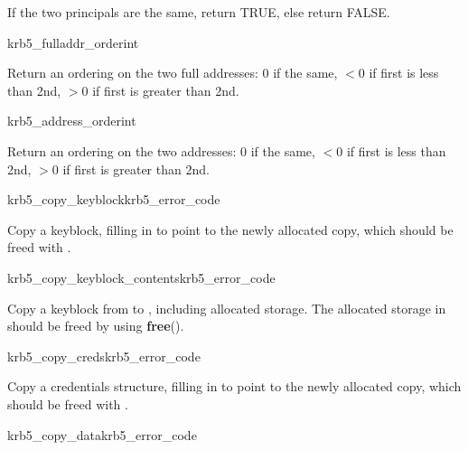 If the two principals are the same, return TRUE, else return FALSE.

\begin{funcdecl}{krb5_fulladdr_order}{int}{\funcin}
\end{funcdecl}

Return an ordering on the two full addresses:  0 if the same,
$< 0$ if first is less than 2nd, $> 0$ if first is greater than 2nd.

\begin{funcdecl}{krb5_address_order}{int}{\funcin}
\end{funcdecl}

Return an ordering on the two addresses:  0 if the same,
$< 0$ if first is less than 2nd, $> 0$ if first is greater than 2nd.

\begin{funcdecl}{krb5_copy_keyblock}{krb5_error_code}{\funcin}
\funcout
{}
\end{funcdecl}

Copy a keyblock, filling in  to point to the newly
allocated copy, which should be freed with
. 

\begin{funcdecl}{krb5_copy_keyblock_contents}{krb5_error_code}{\funcin}
\funcout
{}
\end{funcdecl}

Copy a keyblock from  to , including
allocated storage.  The allocated storage in  should be
freed by using {\bf free}().

\begin{funcdecl}{krb5_copy_creds}{krb5_error_code}{\funcin}
\funcout
{}
\end{funcdecl}

Copy a credentials structure, filling in  to point
to the newly allocated copy, which should be freed with
.

\begin{funcdecl}{krb5_copy_data}{krb5_error_code}{\funcin}
\funcout
{}
\end{funcdecl}

